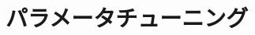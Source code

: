 \documentclass[{../../master}]{subfiles}
\begin{document}
\section{パラメータチューニング}
\label{sec:gmapping_tuning}
\end{document}
